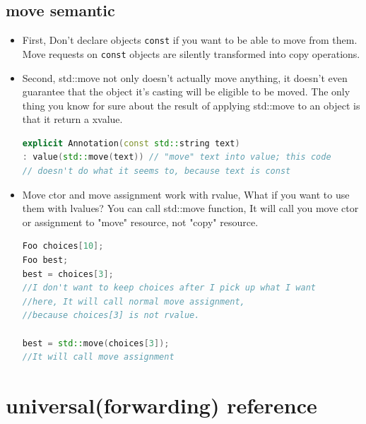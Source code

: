\documentclass[a4paper,11pt,twoside]{book}
\begin{document}
\subsection{move semantic}
\begin{itemize}

\item First, Don't declare objects \texttt{const} if you want to be able to move from them. Move requests on \texttt{const} objects are silently transformed into copy operations.

\item Second, std::move not only doesn't actually move anything, it doesn't even guarantee that the object it's casting will be eligible to be moved. The only thing you know for sure about the result of applying std::move to an object is that it return a xvalue.

\begin{lstlisting}[frame=single, language=c++]
explicit Annotation(const std::string text)
: value(std::move(text)) // "move" text into value; this code
// doesn't do what it seems to, because text is const
\end{lstlisting}


\item Move ctor and move assignment work with rvalue, What if you want to use them with lvalues? You can call std::move function, It will call you move ctor or assignment to "move" resource, not "copy" resource.
\begin{lstlisting}[frame=single, language=c++]
Foo choices[10];
Foo best;
best = choices[3];
//I don't want to keep choices after I pick up what I want
//here, It will call normal move assignment,
//because choices[3] is not rvalue.

best = std::move(choices[3]);
//It will call move assignment
\end{lstlisting}
\end{itemize}



\section{universal(forwarding) reference }
\end{document}
